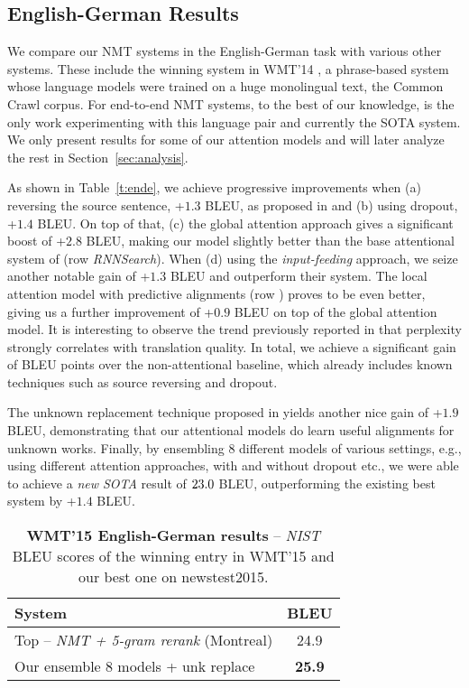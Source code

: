 \subsection{English-German Results}
We compare our NMT systems in the English-German task with various other
systems. These include the winning system in WMT'14
\cite{buck14}, a phrase-based system whose language models were trained on a
huge monolingual text, the Common Crawl corpus. For end-to-end NMT systems, to the best of our knowledge, \cite{jean15} is the only work experimenting with this language pair and currently the SOTA system.
We only present results for some of our attention models and will later
analyze the rest in Section~\ref{sec:analysis}. 

As shown in Table~\ref{t:ende}, we achieve progressive improvements when
(a) reversing the source sentence, +$1.3$ BLEU, as proposed in \cite{sutskever14}
and (b) using dropout, +$1.4$ BLEU. On top of that, (c) the global
attention approach gives a significant boost of +$2.8$ BLEU, making 
 our model slightly better than the base attentional system of
  (row {\it RNNSearch}). When (d) using the {\it input-feeding}
approach, we seize another notable gain of +$1.3$ BLEU and outperform their
system. The local attention model with predictive alignments (row {\it \localp}) proves
to be even better, giving us a further improvement of +$0.9$ BLEU on top of the
global attention model. 
It is interesting to observe the trend previously reported in
\cite{luong15} that perplexity strongly correlates with translation quality.
In total, we achieve a significant gain of
\attngain{} BLEU points over the non-attentional baseline, which already includes
known techniques such as source reversing and dropout.

The unknown replacement technique proposed in \cite{luong15,jean15} yields another nice
gain of +$1.9$ BLEU, demonstrating that our attentional models
do learn useful alignments for unknown works. Finally, by ensembling 8 different
models of various settings, e.g., using different attention approaches, with
and without dropout etc., we were able to achieve a {\it new SOTA} result of
$23.0{}$
BLEU, outperforming the existing best system \cite{jean15} by +$1.4$ BLEU.

\begin{table}[tbh!]
\centering
\begin{tabular}{l|c}
\bf{System} & \bf{BLEU}\\
  \hline
Top -- {\it NMT + 5-gram rerank} (Montreal) & 24.9 \\
  \hline
Our ensemble 8 models + unk replace & {\bf 25.9} \\
\end{tabular}
\caption[WMT'15 English-German results]{{\bf WMT'15 English-German results} -- {\it NIST} BLEU scores of the
winning entry in WMT'15 and our best one on newstest2015.}
\label{t:wmt15ende}
\end{table}

